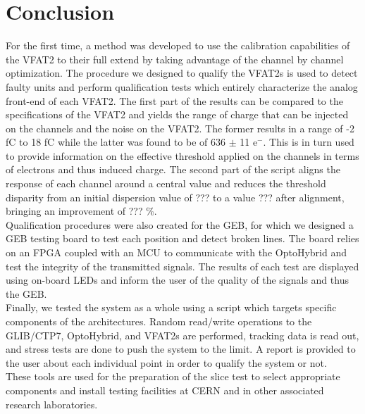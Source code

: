   \section{Conclusion}

    For the first time, a method was developed to use the calibration capabilities of the VFAT2 to their full extend by taking advantage of the channel by channel optimization. The procedure we designed to qualify the VFAT2s is used to detect faulty units and perform qualification tests which entirely characterize the analog front-end of each VFAT2. The first part of the results can be compared to the specifications of the VFAT2 and yields the range of charge that can be injected on the channels and the noise on the VFAT2. The former results in a range of -2 fC to 18 fC while the latter was found to be of 636 $\pm$ 11 e$^-$. This is in turn used to provide information on the effective threshold applied on the channels in terms of electrons and thus induced charge. The second part of the script aligns the response of each channel around a central value and reduces the threshold disparity from an initial dispersion value of ??? to a value ??? after alignment, bringing an improvement of ??? \%. \\


    Qualification procedures were also created for the GEB, for which we designed a GEB testing board to test each position and detect broken lines. The board relies on an FPGA coupled with an MCU to communicate with the OptoHybrid and test the integrity of the transmitted signals. The results of each test are displayed using on-board LEDs and inform the user of the quality of the signals and thus the GEB. \\

    Finally, we tested the system as a whole using a script which targets specific components of the architectures. Random read/write operations to the GLIB/CTP7, OptoHybrid, and VFAT2s are performed, tracking data is read out, and stress tests are done to push the system to the limit. A report is provided to the user about each individual point in order to qualify the system or not. \\

    These tools are used for the preparation of the slice test to select appropriate components and install testing facilities at CERN and in other associated research laboratories.

